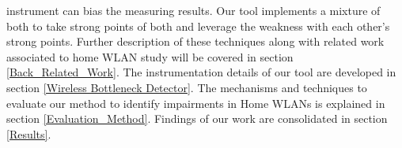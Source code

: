instrument can bias the measuring results. Our tool implements a mixture of both to take strong points of both and leverage the weakness with each other's strong points. Further description of these techniques along with related work associated to home WLAN study will be covered in section \ref{Back_Related_Work}. The instrumentation details of our tool are developed in section \ref{Wireless Bottleneck Detector}. The mechanisms and techniques to evaluate our method to identify impairments in Home WLANs is explained in section \ref{Evaluation_Method}. Findings of our work are consolidated in section \ref{Results}.
 